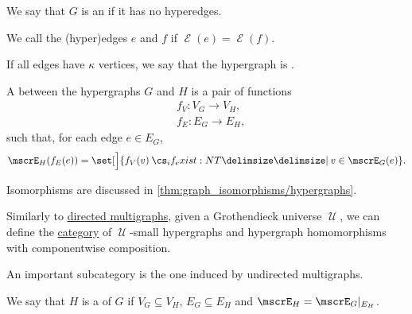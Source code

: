 \begin{definition}
\begin{thmenum}[resume=def:hypergraph]
     We say that \( G \) is an  if it has no hyperedges.

    \mimprovised We call the (hyper)edges \( e \) and \( f \)  if \( \mscrE(e) = \mscrE(f) \).

     If all edges have \( \kappa \) vertices, we say that the hypergraph is .

     A  between the hypergraphs \( G \) and \( H \) is a pair of functions
    \begin{align*}
      &f_V: V_G \to V_H, \\
      &f_E: E_G \to E_H,
    \end{align*}
    such that, for each edge \( e \in E_G \),
    \begin{equation}\label{eq:def:hypergraph/homomorphism}
      \mscrE_H(f_E(e)) = \set[\Big]{ f_V(v) \given* v \in \mscrE_G(e) }.
    \end{equation}

    Isomorphisms are discussed in \cref{thm:graph_isomorphisms/hypergraphs}.

     Similarly to \hyperref[def:directed_multigraph]{directed multigraphs}, given a Grothendieck universe \( \mscrU \), we can define the \hyperref[def:category]{category} of \( \mscrU \)-small hypergraphs and hypergraph homomorphisms with componentwise composition.

    An important subcategory is the one induced by undirected multigraphs.

    \mimprovised We say that \( H \) is a  of \( G \) if \( V_G \subseteq V_H \), \( E_G \subseteq E_H \) and \( \mscrE_H = \mscrE_G\restr_{E_H} \).
  \end{thmenum}
\end{definition}
